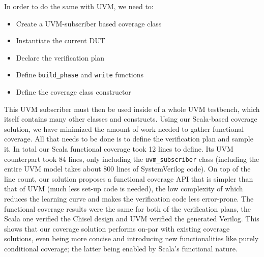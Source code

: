 \documentclass[conference]{IEEEtran}
\newcommand{\todo}[1]{{\color{olive} TODO: #1}}
\newcommand{\martin}[1]{{\color{blue} Martin: #1}}
\begin{document}
In order to do the same with UVM, we need to:  
\begin{itemize}
    \item Create a UVM-subscriber based coverage class
    \item Instantiate the current DUT %
    \item Declare the verification plan
    \item Define \texttt{build\_phase} and \texttt{write} functions
    \item Define the coverage class constructor
\end{itemize}  
This UVM subscriber must then be used inside of a whole UVM testbench, which itself contains many other classes and constructs.
Using our Scala-based coverage solution, we have minimized the amount of work needed to gather functional coverage. 
All that needs to be done is to define the verification plan and sample it.
In total our Scala functional coverage took 12 lines to define.
Its UVM counterpart took 84 lines, only including the \texttt{uvm\_subscriber} class (including the entire UVM model takes about 800 lines of SystemVerilog code). %
On top of the line count, our solution proposes a functional coverage API that is simpler than that of UVM (much less set-up code is needed), the low complexity of which reduces the learning curve and makes the verification code less error-prone.
The functional coverage results were the same for both of the verification plans, the Scala one verified the Chisel design and UVM verified the generated Verilog.
This shows that our coverage solution performs on-par with existing coverage solutions, even being more concise and introducing new functionalities like purely conditional coverage; the latter being enabled by Scala's functional nature. 
\end{document}
